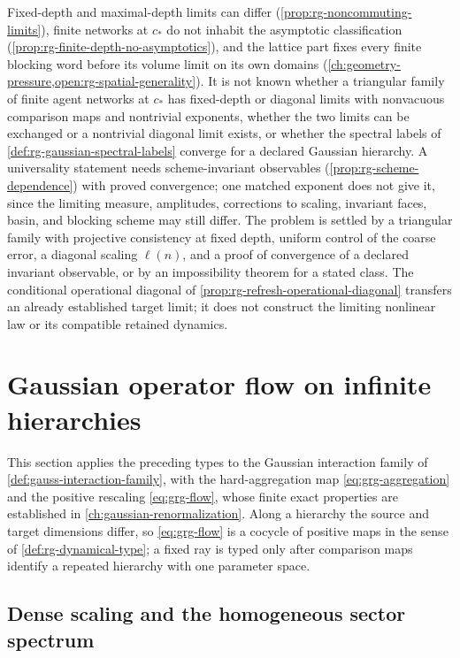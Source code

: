 Fixed-depth and maximal-depth limits can differ
(\cref{prop:rg-noncommuting-limits}), finite networks at \(c_*\) do not inhabit
the asymptotic classification (\cref{prop:rg-finite-depth-no-asymptotics}),
and the lattice part fixes every finite blocking word before its volume limit
on its own domains (\cref{ch:geometry-pressure,open:rg-spatial-generality}). It
is not known whether a triangular family of finite agent networks at \(c_*\)
has fixed-depth or diagonal limits with nonvacuous comparison maps and
nontrivial exponents, whether the two limits can be exchanged or a nontrivial
diagonal limit exists, or whether the spectral labels of
\cref{def:rg-gaussian-spectral-labels} converge for a declared Gaussian
hierarchy. A universality statement needs scheme-invariant observables
(\cref{prop:rg-scheme-dependence}) with proved convergence; one matched
exponent does not give it, since the limiting measure, amplitudes, corrections
to scaling, invariant faces, basin, and blocking scheme may still differ. The
problem is settled by a triangular family with projective consistency at fixed
depth, uniform control of the coarse error, a diagonal scaling \(\ell(n)\), and
a proof of convergence of a declared invariant observable, or by an
impossibility theorem for a stated class. The conditional operational
diagonal of \cref{prop:rg-refresh-operational-diagonal} transfers an
already established target limit; it does not construct the limiting
nonlinear law or its compatible retained dynamics.

\section{Gaussian operator flow on infinite hierarchies}

This section applies the preceding types to the Gaussian interaction family
of \cref{def:gauss-interaction-family}, with the hard-aggregation map
\eqref{eq:grg-aggregation} and the positive rescaling \eqref{eq:grg-flow}, whose
finite exact properties are established in
\cref{ch:gaussian-renormalization}. Along a hierarchy the source and target
dimensions differ, so \eqref{eq:grg-flow} is a cocycle of positive maps in the
sense of \cref{def:rg-dynamical-type}; a fixed ray is typed only after
comparison maps identify a repeated hierarchy with one parameter space.

\subsection{Dense scaling and the homogeneous sector spectrum}
\label{sec:grg-numerical-gate}

